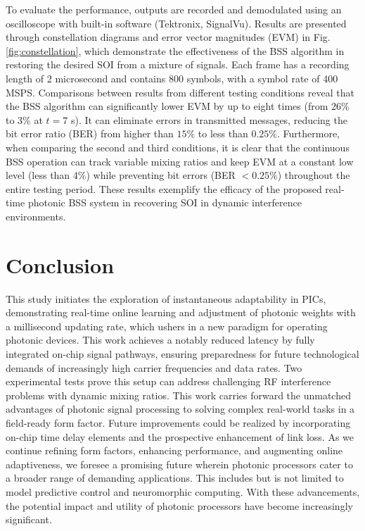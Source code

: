 \documentclass[pdflatex,mathphys]{sty}%
\begin{document}
To evaluate the performance, outputs are recorded and demodulated using an oscilloscope with built-in software (Tektronix, SignalVu). Results are presented through constellation diagrams and error vector magnitudes (EVM) in  Fig. \ref{fig:constellation}, which demonstrate the effectiveness of the BSS algorithm in restoring the desired SOI from a mixture of signals. Each frame has a recording length of 2 microsecond and contains 800 symbols, with a symbol rate of 400 MSPS. Comparisons between results from different testing conditions reveal that the BSS algorithm can significantly lower EVM by up to eight times (from $26\%$ to $3\%$ at $t=7$ s). It can eliminate errors in transmitted messages, reducing the bit error ratio (BER) from higher than $15\%$ to less than $0.25\%$. Furthermore, when comparing the second and third conditions, it is clear that the continuous BSS operation can track variable mixing ratios and keep EVM at a constant low level (less than $4\%$) while preventing bit errors (BER $<0.25\%$) throughout the entire testing period. These results exemplify the efficacy of the proposed real-time photonic BSS system in recovering SOI in dynamic interference environments.

\section{Conclusion}

This study initiates the exploration of instantaneous adaptability in PICs, demonstrating real-time online learning and adjustment of photonic weights with a millisecond updating rate, which ushers in a new paradigm for operating photonic devices. This work achieves a notably reduced latency by fully integrated on-chip signal pathways, ensuring preparedness for future technological demands of increasingly high carrier frequencies and data rates. Two experimental tests prove this setup can address challenging RF interference problems with dynamic mixing ratios. This work carries forward the unmatched advantages of photonic signal processing to solving complex real-world tasks in a field-ready form factor. Future improvements could be realized by incorporating on-chip time delay elements and the prospective enhancement of link loss. As we continue refining form factors, enhancing performance, and augmenting online adaptiveness, we foresee a promising future wherein photonic processors cater to a broader range of demanding applications. This includes but is not limited to model predictive control \cite{huang2022prospects,de2019machine} and neuromorphic computing. With these advancements, the potential impact and utility of photonic processors have become increasingly significant.
\end{document}
